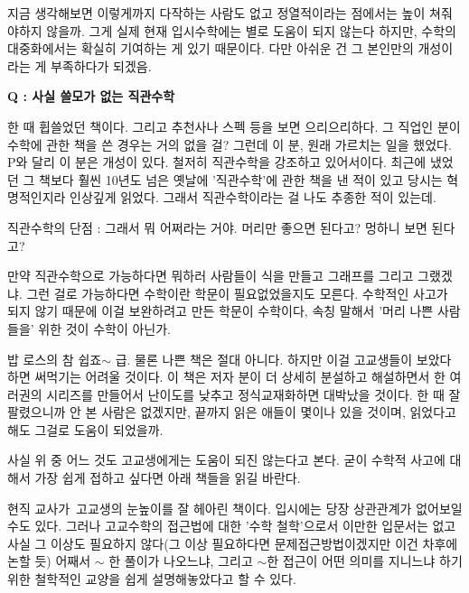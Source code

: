 지금 생각해보면 이렇게까지 다작하는 사람도 없고 정열적이라는 점에서는 높이 쳐줘야하지 않을까.
그게 실제 현재 입시수학에는 별로 도움이 되지 않는다 하지만, 수학의 대중화에서는 확실히 기여하는 게 있기 때문이다.
다만 아쉬운 건 그 본인만의 개성이라는 게 부족하다가 되겠음.
\vspace{5mm}

\textbf{Q : 사실 쓸모가 없는 직관수학}
\vspace{5mm}

한 때 휩쓸었던 책이다. 그리고 추천사나 스펙 등을 보면 으리으리하다.
그 직업인 분이 수학에 관한 책을 쓴 경우는 거의 없을 걸? 그런데 이 분, 원래 가르치는 일을 했었다.
P와 달리 이 분은 개성이 있다. 철저히 직관수학을 강조하고 있어서이다.
최근에 냈었던 그 책보다 훨씬 10년도 넘은 옛날에 '직관수학'에 관한 책을 낸 적이 있고 당시는 혁명적인지라 인상깊게 읽었다.
그래서 직관수학이라는 걸 나도 추종한 적이 있는데.
\vspace{5mm}

직관수학의 단점 : 그래서 뭐 어쩌라는 거야. 머리만 좋으면 된다고? 멍하니 보면 된다고?
\vspace{5mm}

만약 직관수학으로 가능하다면 뭐하러 사람들이 식을 만들고 그래프를 그리고 그랬겠냐.
그런 걸로 가능하다면 수학이란 학문이 필요없었을지도 모른다.
수학적인 사고가 되지 않기 때문에 이걸 보완하려고 만든 학문이 수학이다, 속칭 말해서 '머리 나쁜 사람들을' 위한 것이 수학이 아닌가.
\vspace{5mm}

밥 로스의 참 쉽죠$\sim$ 급.
물론 나쁜 책은 절대 아니다. 하지만 이걸 고교생들이 보았다하면 써먹기는 어려울 것이다.
이 책은 저자 분이 더 상세히 분설하고 해설하면서 한 여러권의 시리즈를 만들어서 난이도를 낮추고 정식교재화하면 대박났을 것이다.
한 때 잘 팔렸으니까 안 본 사람은 없겠지만, 끝까지 읽은 애들이 몇이나 있을 것이며, 읽었다고 해도 그걸로 도움이 되었을까.
\vspace{5mm}

사실 위 중 어느 것도 고교생에게는 도움이 되진 않는다고 본다.
굳이 수학적 사고에 대해서 가장 쉽게 접하고 싶다면 아래 책들을 읽길 바란다.
\vspace{5mm}

현직 교사가 고교생의 눈높이를 잘 헤아린 책이다.
입시에는 당장 상관관계가 없어보일 수도 있다. 그러나 고교수학의 접근법에 대한 '수학 철학'으로서 이만한 입문서는 없고
사실 그 이상도 필요하지 않다(그 이상 필요하다면 문제접근방법이겠지만 이건 차후에 논할 듯)
어째서 $\sim$ 한 풀이가 나오느냐, 그리고 $\sim$한 접근이 어떤 의미를 지니느냐 하기 위한 철학적인 교양을 쉽게 설명해놓았다고 할 수 있다.
\vspace{5mm}

